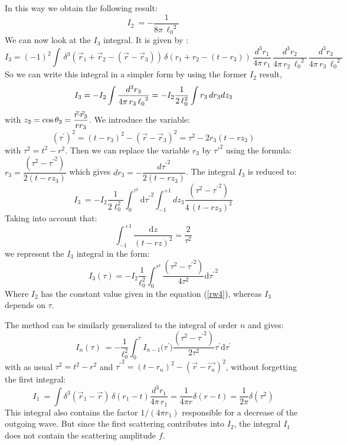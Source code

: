 \documentclass[a4paper,12pt]{article}
\newcommand{\cd}{\makebox[0.08cm]{$\cdot$}}
\newcommand{\dd}{\text{d}}%
\begin{document}
In this way we obtain the following result:
\begin{equation}\label{rw4}
I_{2}\ =-\dfrac{1}{8\pi\,{\ell_{0}}^{\!\!2}}
\end{equation}
We can now look at the $I_{3}$ integral. It is given by :
\[
I_{3}=(-1)^2\int\,\delta^{3}\!\left(\vec{r}_{1} + \vec{r}_{2} -
(\vec{r} -\vec{r}_{3})\right)\,
\delta(r_{1} + r_{2} - (t - r_{3}))
\,\dfrac{d^{3}r_{1}}{4\pi\,r_{1}}
\,\dfrac{d^{3}r_{2}}{4\pi\,r_{2}\,{\ell_{0}}^{2}}
\,\dfrac{d^{3}r_{3}}{4\pi\,r_{3}\,{\ell_{0}}^{2}}
\]
So we can write this integral in a simpler form by using the former
$I_{2}$ result,
$$
I_{3}=-I_{2} \int
\frac{d^{3}r_{3}}{4\pi\,r_{3}\,{\ell_{0}}^{2}}\\
=-I_{2}\dfrac{1}{2\,\ell_{0}^{2}} \int r_{3}\,dr_{3}d z_3
$$
with  $z_3 = \cos{\theta_3} =
\dfrac{\vec{r}\cd\vec{r}_{3}}{rr_3}$. We introduce the variable:
$$
(\tau^{\prime})^{2} = (t-r_{3})^{2}-(\vec{r}-\vec{r}_{3})^{2} =
\tau^{2}-2r_{3} (t-r z_3)$$ with $\tau^{2} = t^{2}-r^{2}$. Then we
can replace the variable $r_3$ by ${\tau'}^2$ using the formula:
$r_{3} =\dfrac{(\tau ^{2}-{\tau^{\prime}}^{2})}{2(t-rz_3)}$ which
gives $d r_{3} = -\dfrac{d {\tau^{\prime}}^2}{2(t-rz_3)}$. The
integral $I_3$ is reduced to:
\[
I_{3}\ = -I_{2} \dfrac{1}{2 \ell_{0}^{2}} \int_{0}^{\tau^{2}}\dd
{\tau^{\prime}}^2\! \int _{-1}^{+1}d z_3\dfrac{(\tau
^{2}-{\tau^{\prime}}^{2})}{4\,(t-rz_3)^{2}}
\]
Taking into account that:
\[
\int _{-1}^{+1}\dfrac{\dd z}{(t-rz)^{2}} =\dfrac{2}{\tau ^{2}}
\]
we represent  the $I_{3}$ integral  in the form:
\[
I_{3}(\tau) = -I_{2}\dfrac{1}{\ell_{0}^{2}}  \int _{0}^{\tau^{2}}
\dfrac{(\tau ^{2}-{\tau^{\prime}}^2)}{4 \tau^{2}}\dd
{\tau^{\prime}}^{2}
\]
Where $I_2$ has the constant value given in the equation (\ref{rw4}), whereas $I_3$ depends on $\tau$.

The method can be similarly generalized to the integral of order
$n$ and gives:
\begin{equation}\label{rw5}
I_{n}(\tau)\ = -\dfrac{1}{\ell_{0}^{2}} \int_{0}^{\tau}
I_{n-1}\bigl({{\tau^{\prime}}}\bigr)\dfrac{(\tau
^{2}-{\tau^{\prime}}^{2})}{2 \tau^{2}}\tau^{\prime}\dd {\tau^{\prime}}
\end{equation}
with as usual   $\tau ^{2} =t^{2}-r^{2}$    and ${\tau^{\prime}}^{2}
= (t-r_{n})^{2}-(\vec r-\vec {r_{n}})^{2}$,
without forgetting the first integral:
\begin{equation}\label{rw5a}
I_{1}\ = \int \delta^{3}\!\left({\vec{r}_{1} -
\vec r}\right)\,\delta \left(r_{1}-t\right)
\frac{d^{3}r_{1}}{4\pi\,r_{1}} =
\frac{1}{4\pi r}
\delta\left(r-t\right)=\frac{1}{2\pi}\delta\left(\tau^2\right)
\end{equation}
This integral also contains the factor  $1/(4\pi r_{1})$
responsible for a decrease of the outgoing wave. But since the
first scattering contributes into $I_{2}$, the integral $I_{1}$
does not contain the scattering amplitude $f$.
\end{document}
